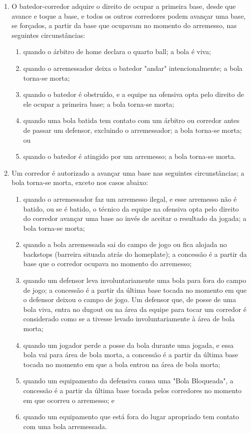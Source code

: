 \begin{enumerate}[label=\roman*.]
	\item O batedor-corredor adquire o direito de ocupar a primeira base, desde que avance e toque a base, e todos os outros corredores podem avançar uma base, se forçados, a partir da base que ocupavam no momento do arremesso, nas seguintes circunstâncias:

	\begin{enumerate}[label=\arabic*)]
		\item quando o árbitro de \gls{home} declara o quarto \gls{ball}; a bola é viva;
		\item quando o arremessador deixa o batedor "andar" intencionalmente; a bola torna-se morta;
		\item  quando o batedor é obstruído, e a equipe na ofensiva opta pelo direito de ele ocupar a primeira base; a bola torna-se morta;
		\item  quando uma bola batida tem contato com um árbitro ou corredor antes de passar um defensor, excluindo o arremessador; a bola torna-se morta; ou
		\item  quando o batedor é atingido por um arremesso; a bola torna-se morta.
	\end{enumerate}
	\item Um corredor é autorizado a avançar uma base nas seguintes circunstâncias; a bola torna-se morta, exceto nos casos abaixo:

	\begin{enumerate}[label=\arabic*)]
		\item quando o arremessador faz um arremesso ilegal, e esse arremesso não é batido, ou se é batido, o técnico da equipe na ofensiva opta pelo direito do corredor avançar uma base ao invés de aceitar o resultado da jogada; a bola torna-se morta;
		\item  quando a bola arremessada sai do campo de jogo ou fica alojada no \glspl{backstop} (barreira situada atrás do \gls{homeplate}); a concessão é a partir da base que o corredor ocupava no momento do arremesso;
		\item  quando um defensor leva involuntariamente uma bola para fora do campo de jogo; a concessão é a partir da última base tocada no momento em que o defensor deixou o campo de jogo. Um defensor que, de posse de uma bola viva, entra no \gls{dugout} ou na área da equipe para tocar um corredor é considerado como se a tivesse levado involuntariamente à área de bola morta;
		\item  quando um jogador perde a posse da bola durante uma jogada, e essa bola vai para área de bola morta, a concessão é a partir da última base tocada no momento em que a bola entrou na área de bola morta;
		\item  quando um equipamento da defensiva causa uma "Bola Bloqueada", a concessão é a partir da última base tocada pelos corredores no momento em que ocorreu o arremesso; e
		\item  quando um equipamento que está fora do lugar apropriado tem contato com uma bola arremessada.


\end{enumerate}
\end{enumerate}
